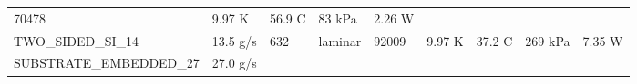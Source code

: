 \documentclass[10pt,]{article}
\begin{document}
\begin{longtable}[]{@{}lllllllll@{}}
\begin{minipage}[t]{0.08\columnwidth}
70478\strut
\end{minipage} & \begin{minipage}[t]{0.08\columnwidth}\raggedright
9.97 K\strut
\end{minipage} & \begin{minipage}[t]{0.08\columnwidth}\raggedright
56.9 C\strut
\end{minipage} & \begin{minipage}[t]{0.08\columnwidth}\raggedright
83 kPa\strut
\end{minipage} & \begin{minipage}[t]{0.08\columnwidth}\raggedright
2.26 W\strut
\end{minipage}\tabularnewline
\begin{minipage}[t]{0.08\columnwidth}\raggedright
TWO\_SIDED\_SI\_14\strut
\end{minipage} & \begin{minipage}[t]{0.08\columnwidth}\raggedright
13.5 g/s\strut
\end{minipage} & \begin{minipage}[t]{0.08\columnwidth}\raggedright
632\strut
\end{minipage} & \begin{minipage}[t]{0.08\columnwidth}\raggedright
laminar\strut
\end{minipage} & \begin{minipage}[t]{0.08\columnwidth}\raggedright
92009\strut
\end{minipage} & \begin{minipage}[t]{0.08\columnwidth}\raggedright
9.97 K\strut
\end{minipage} & \begin{minipage}[t]{0.08\columnwidth}\raggedright
37.2 C\strut
\end{minipage} & \begin{minipage}[t]{0.08\columnwidth}\raggedright
269 kPa\strut
\end{minipage} & \begin{minipage}[t]{0.08\columnwidth}\raggedright
7.35 W\strut
\end{minipage}\tabularnewline
\begin{minipage}[t]{0.08\columnwidth}\raggedright
SUBSTRATE\_EMBEDDED\_27\strut
\end{minipage} & \begin{minipage}[t]{0.08\columnwidth}\raggedright
27.0 g/s\strut
\end{minipage} & \begin{minipage}[t]{0.08\columnwidth}\raggedright

\end{minipage}
\end{longtable}
\end{document}
